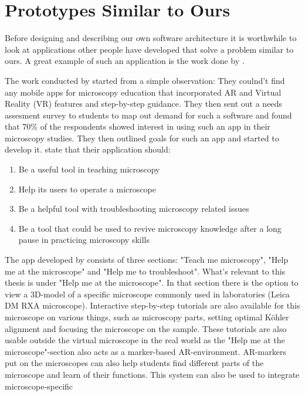 \section{Prototypes Similar to Ours} \label{protos}
Before designing and describing our own software architecture it is 
worthwhile to look at applications other people have developed that solve a 
problem similar to ours. A great example of such an application is the work 
done by \textcite{pylvanainen}. \par
	The work conducted by \textcite{pylvanainen} started from a simple
observation: They coulnd't find any mobile apps for microscopy education that 
incorporated AR and Virtual Reality (VR) features and step-by-step guidance. 
They then sent out a needs assesment survey to students to map out demand for 
such a software and found that 70\% of the respondents showed interest in 
using such an app in their microscopy studies.\cite{pylvanainen} They then 
outlined goals for such an app and started to develop it. 
\textcite{pylvanainen} state that their application should:
\begin{enumerate}
	\item Be a useful tool in teaching microscopy
	\item Help its users to operate a microscope
	\item Be a helpful tool with troubleshooting microscopy related issues
	\item Be a tool that could be used to revive microscopy knowledge after a long pause in practicing microscopy skills
\end{enumerate} \par
	The app developed by \textcite{pylvanainen} consists of three 
sections: "Teach me microscopy", "Help me at the microscope" and "Help me to 
troubleshoot". What's relevant to this thesis is under "Help me at the 
microscope". In that section there is the option to view a 3D-model of a 
specific microscope commonly used in laboratories (Leica DM RXA microscope). 
Interactive step-by-step tutorials are also available for this microscope on 
various things, such as microscopy parts, setting optimal Köhler alignment 
and focusing the microscope on the sample. These tutorials are also usable 
outside the virtual microscope in the real world as the "Help me at the 
microscope"-section also acts as a marker-based 
AR-environment.\cite{pylvanainen} AR-markers put on the microscopes can also 
help students find different parts of the microscope and learn of their 
functions. This system can also be used to integrate microscope-specific 
